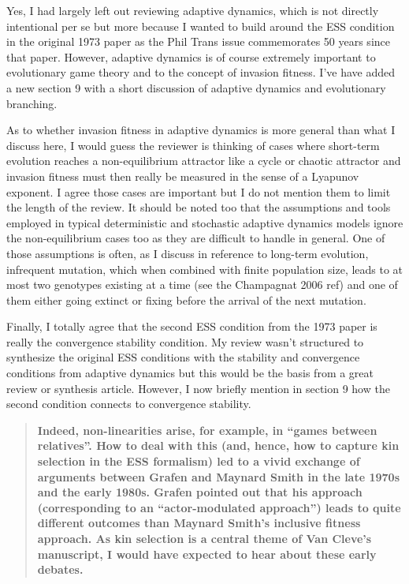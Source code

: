 \documentclass[10pt,parskip=full,foldmarks=off,addrfield=off,backaddress=false,refline=dateleft,letterpaper]{scrlttr2}
\newenvironment{reviewerquote}{\begin{quote}\color{DarkBlue}\bfseries}{\end{quote}}
\begin{document}
\begin{letter}
Yes, I had largely left out reviewing adaptive dynamics, which is not directly intentional per se but more because I wanted to build around the ESS condition in the original 1973 paper as the Phil Trans issue commemorates 50 years since that paper. However, adaptive dynamics is of course extremely important to evolutionary game theory and to the concept of invasion fitness. I've have added a new section 9 with a short discussion of adaptive dynamics and evolutionary branching.

As to whether invasion fitness in adaptive dynamics is more general than what I discuss here, I would guess the reviewer is thinking of cases where short-term evolution reaches a non-equilibrium attractor like a cycle or chaotic attractor and invasion fitness must then really be measured in the sense of a Lyapunov exponent. I agree those cases are important but I do not mention them to limit the length of the review. It should be noted too that the assumptions and tools employed in typical deterministic and stochastic adaptive dynamics models ignore the non-equilibrium cases too as they are difficult to handle in general. One of those assumptions is often, as I discuss in reference to long-term evolution, infrequent mutation, which when combined with finite population size, leads to at most two genotypes existing at a time (see the Champagnat 2006 ref) and one of them either going extinct or fixing before the arrival of the next mutation.

Finally, I totally agree that the second ESS condition from the 1973 paper is really the convergence stability condition. My review wasn't structured to synthesize the original ESS conditions with the stability and convergence conditions from adaptive dynamics but this would be the basis from a great review or synthesis article. However, I now briefly mention in section 9 how the second condition connects to convergence stability.

\begin{reviewerquote}
  Indeed, non-linearities arise, for example, in “games between relatives”. How to deal with this (and, hence, how to capture kin selection in the ESS formalism) led to a vivid exchange of arguments between Grafen and Maynard Smith in the late 1970s and the early 1980s. Grafen pointed out that his approach (corresponding to an “actor-modulated approach”) leads to quite different outcomes than Maynard Smith’s inclusive fitness approach. As kin selection is a central theme of Van Cleve’s manuscript, I would have expected to hear about these early debates.
\end{reviewerquote}


\end{letter}
\end{document}
